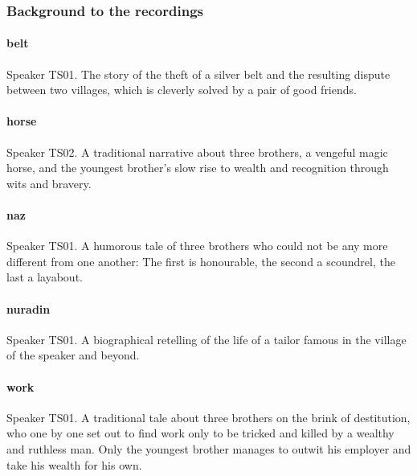 \subsubsection*{Background to the recordings}

\paragraph{belt}
Speaker TS01. The story of the theft of a silver belt and the resulting dispute between two villages, which is cleverly solved by a pair of good friends.

\paragraph{horse}
Speaker TS02. A traditional narrative about three brothers, a vengeful magic horse, and the youngest brother's slow rise to wealth and recognition through wits and bravery.

\paragraph{naz}
Speaker TS01. A humorous tale of three brothers who could not be any more different from one another: The first is honourable, the second a scoundrel, the last a layabout.

\paragraph{nuradin}
Speaker TS01. A biographical retelling of the life of a tailor famous in the village of the speaker and beyond.

\paragraph{work}
Speaker TS01. A traditional tale about three brothers on the brink of destitution, who one by one set out to find work only to be tricked and killed by a wealthy and ruthless man. Only the youngest brother manages to outwit his employer and take his wealth for his own.




